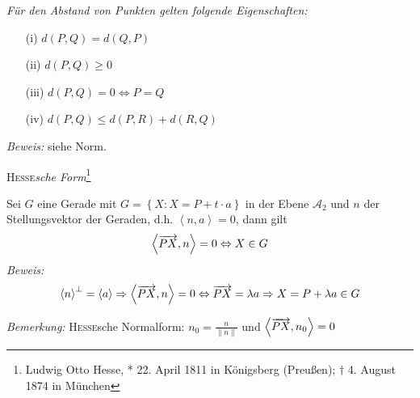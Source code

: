 \begin{mysatz}\textit{Für den Abstand von Punkten gelten folgende Eigenschaften:}
    \begin{itemize}
        \item[(i)] $d(P,Q) = d(Q,P)$
        \item[(ii)] $d(P,Q) \geq 0$
        \item[(iii)] $d(P,Q) = 0 \Leftrightarrow P = Q$
        \item[(iv)] $d(P,Q) \leq d(P,R) + d(R,Q)$
    \end{itemize}
    \textit{Beweis:} siehe Norm.
\end{mysatz}

\begin{mylemma}\textsc{Hesse}\textit{sche Form}\footnote{Ludwig Otto Hesse, * 22. April 1811 in Königsberg (Preußen); $\dagger$ 4. August 1874 in München}

    Sei $G$ eine Gerade mit $G = \left\{ X : X = P+t \cdot a \right\}$ in der Ebene $\mathcal{A}_2$ und $n$ der Stellungsvektor der Geraden, d.h. $\left\langle n,a \right\rangle=0$, dann gilt
    \begin{align*}
        \left\langle \overrightarrow{PX} , n \right\rangle = 0 \Leftrightarrow X \in G
    \end{align*}
    \textit{Beweis:}
    \begin{align*}
        \left\langle n \right\rangle^{\bot} = \left\langle a \right\rangle \Rightarrow \left\langle \overrightarrow{PX} , n \right\rangle = 0 \Leftrightarrow \overrightarrow{PX} = \lambda a \Rightarrow X = P + \lambda a \in G
    \end{align*}
\end{mylemma}
\textit{Bemerkung:} \textsc{Hesse}sche Normalform: $n_0 = \frac{n}{\| n \|}$ und $\left\langle \overrightarrow{PX} , n_0 \right\rangle = 0$

